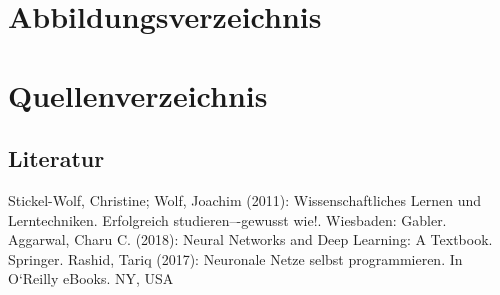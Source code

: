 \documentclass[a4paper,12pt,oneside]{article}
\begin{document}
  \newpage
  \tableofcontents
  
  \newpage
  \pagestyle{fancy} %
  

  \section*{Abbildungsverzeichnis}
  \renewcommand{\listfigurename}{} %
  \thispagestyle{empty}
  \listoffigures
  
  

  
  
  
  
    

  \newpage
  \thispagestyle{empty}
  \section{Quellenverzeichnis}
    \subsection{Literatur}
    \renewcommand{\refname}{} %
    \begin{thebibliography}{SW11} %
       Stickel-Wolf, Christine; Wolf, Joachim (2011): Wissenschaftliches Lernen und Lerntechniken. Erfolgreich studieren–-gewusst wie!. Wiesbaden: Gabler. 
       Aggarwal, Charu C. (2018): Neural Networks and Deep Learning: A Textbook. Springer.
       Rashid, Tariq (2017): Neuronale Netze selbst programmieren. In O`Reilly eBooks. NY, USA
    \end{thebibliography} 
        
\end{document}
